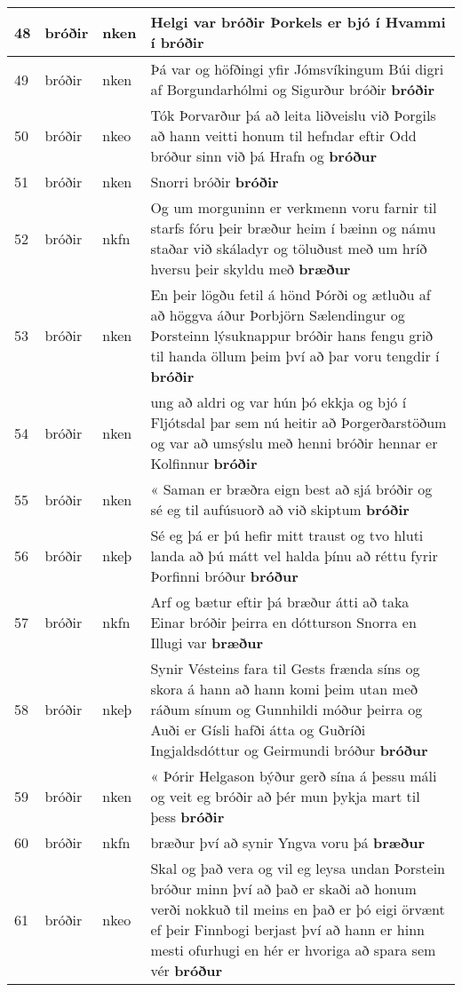 \documentclass{article}
\begin{document}
\begin{longtable}{p{1cm}|p{1cm}|p{1cm}|p{13cm}}
\hline
48&bróðir&nken&Helgi var bróðir Þorkels er bjó í Hvammi í \textbf{bróðir} \\
\hline
49&bróðir&nken&Þá var og höfðingi yfir Jómsvíkingum Búi digri af Borgundarhólmi og Sigurður bróðir \textbf{bróðir} \\
\hline
50&bróðir&nkeo&Tók Þorvarður þá að leita liðveislu við Þorgils að hann veitti honum til hefndar eftir Odd bróður sinn við þá Hrafn og \textbf{bróður} \\
\hline
51&bróðir&nken&Snorri bróðir \textbf{bróðir} \\
\hline
52&bróðir&nkfn&Og um morguninn er verkmenn voru farnir til starfs fóru þeir bræður heim í bæinn og námu staðar við skáladyr og töluðust með um hríð hversu þeir skyldu með \textbf{bræður} \\
\hline
53&bróðir&nken&En þeir lögðu fetil á hönd Þórði og ætluðu af að höggva áður Þorbjörn Sælendingur og Þorsteinn lýsuknappur bróðir hans fengu grið til handa öllum þeim því að þar voru tengdir í \textbf{bróðir} \\
\hline
54&bróðir&nken&ung að aldri og var hún þó ekkja og bjó í Fljótsdal þar sem nú heitir að Þorgerðarstöðum og var að umsýslu með henni bróðir hennar er Kolfinnur \textbf{bróðir} \\
\hline
55&bróðir&nken&« Saman er bræðra eign best að sjá bróðir og sé eg til aufúsuorð að við skiptum \textbf{bróðir} \\
\hline
56&bróðir&nkeþ&Sé eg þá er þú hefir mitt traust og tvo hluti landa að þú mátt vel halda þínu að réttu fyrir Þorfinni bróður \textbf{bróður} \\
\hline
57&bróðir&nkfn&Arf og bætur eftir þá bræður átti að taka Einar bróðir þeirra en dótturson Snorra en Illugi var \textbf{bræður} \\
\hline
58&bróðir&nkeþ&Synir Vésteins fara til Gests frænda síns og skora á hann að hann komi þeim utan með ráðum sínum og Gunnhildi móður þeirra og Auði er Gísli hafði átta og Guðríði Ingjaldsdóttur og Geirmundi bróður \textbf{bróður} \\
\hline
59&bróðir&nken&« Þórir Helgason býður gerð sína á þessu máli og veit eg bróðir að þér mun þykja mart til þess \textbf{bróðir} \\
\hline
60&bróðir&nkfn&bræður því að synir Yngva voru þá \textbf{bræður} \\
\hline
61&bróðir&nkeo&Skal og það vera og vil eg leysa undan Þorstein bróður minn því að það er skaði að honum verði nokkuð til meins en það er þó eigi örvænt ef þeir Finnbogi berjast því að hann er hinn mesti ofurhugi en hér er hvoriga að spara sem vér \textbf{bróður} \\

\end{longtable}
\end{document}
